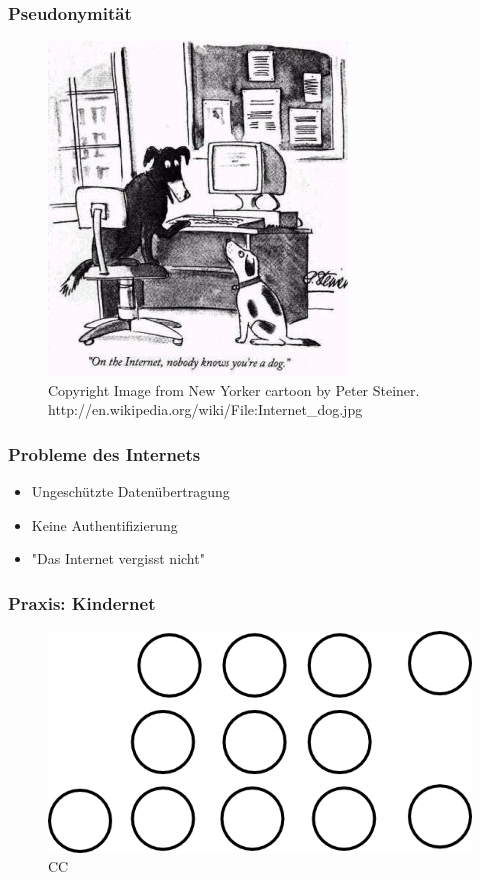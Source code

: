 \documentclass{beamer}
\begin{document}
\begin{frame}
  \frametitle{Pseudonymität}
  \begin{figure}
    \includegraphics[height=0.7\textheight]{img/internet_dog.jpg}
    \caption{Copyright Image from New Yorker cartoon by Peter Steiner. http://en.wikipedia.org/wiki/File:Internet\_dog.jpg}
  \end{figure}
\end{frame}

\begin{frame}
  \frametitle{Probleme des Internets}
  \begin{itemize}
    \item<2-> Ungeschützte Datenübertragung
    \item<3-> Keine Authentifizierung
    \item<4-> "Das Internet vergisst nicht"
  \end{itemize}
\end{frame}

\begin{frame}
  \frametitle{Praxis: Kindernet}
  \begin{figure}
      \includegraphics[height=0.7\textheight]{img/kindernet.png}
      \caption{CC}
  \end{figure}
\end{frame}
\end{document}
